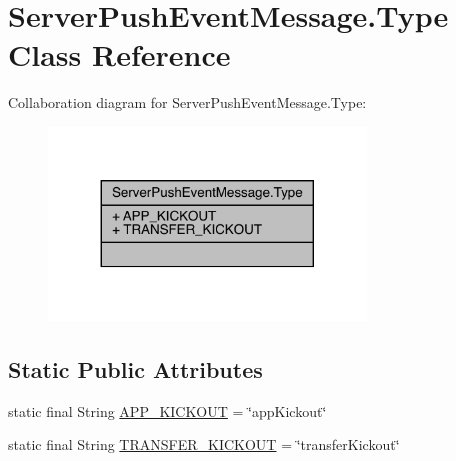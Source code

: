 \hypertarget{classcom_1_1toast_1_1android_1_1gamebase_1_1serverpush_1_1_server_push_event_message_1_1_type}{}\section{Server\+Push\+Event\+Message.\+Type Class Reference}
\label{classcom_1_1toast_1_1android_1_1gamebase_1_1serverpush_1_1_server_push_event_message_1_1_type}


Collaboration diagram for Server\+Push\+Event\+Message.\+Type\+:\nopagebreak
\begin{figure}[H]
\begin{center}
\leavevmode
\includegraphics[width=239pt]{classcom_1_1toast_1_1android_1_1gamebase_1_1serverpush_1_1_server_push_event_message_1_1_type__coll__graph}
\end{center}
\end{figure}
\subsection*{Static Public Attributes}
\begin{DoxyCompactItemize}
\item 
static final String \hyperlink{classcom_1_1toast_1_1android_1_1gamebase_1_1serverpush_1_1_server_push_event_message_1_1_type_aed5d555ac6644d18d5b1525ecf9e0032}{A\+P\+P\+\_\+\+K\+I\+C\+K\+O\+UT} = \char`\"{}app\+Kickout\char`\"{}
\item 
static final String \hyperlink{classcom_1_1toast_1_1android_1_1gamebase_1_1serverpush_1_1_server_push_event_message_1_1_type_a81c56ad395197d1634b83ca193669bd8}{T\+R\+A\+N\+S\+F\+E\+R\+\_\+\+K\+I\+C\+K\+O\+UT} = \char`\"{}transfer\+Kickout\char`\"{}
\end{DoxyCompactItemize}


